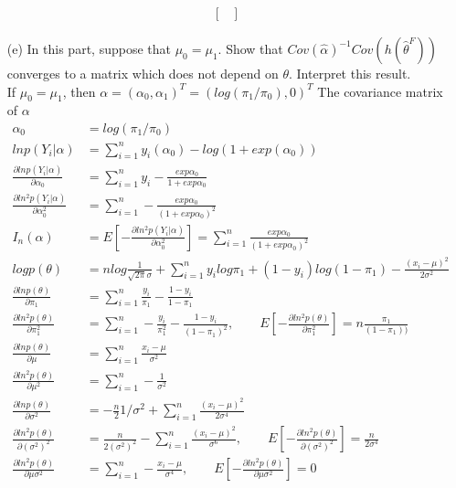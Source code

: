 \documentclass[11pt]{article} %
\begin{document}
\begin{itemize}
\begin{align*}
\begin{bmatrix}
		\end{bmatrix}
	\end{align*}   
	\item[(e)] In this part, suppose that $\mu_0= \mu_1$. Show that $Cov(\hat\alpha)^{-1} Cov(h(\hat\theta^F))$ converges to a matrix which does not depend on $\theta$. Interpret this result.\\
	If $\mu_0= \mu_1$, then $\alpha = (\alpha_0, \alpha_1)^T = \left(log(\pi_1/\pi_0) ,  0 \right)^T$
	The covariance matrix of $\alpha$
	\begin{align*}    
		\alpha_0 & = log(\pi_1/\pi_0)\\
		ln p(Y_i|\alpha) &= \sum_{i=1}^n y_i (\alpha_0) - log \left(1 + exp(\alpha_0) \right)\\
		\frac{\partial ln p(Y_i|\alpha)}{\partial \alpha_0}  &= \sum_{i=1}^n y_i -\frac{exp\alpha_0}{1+ exp\alpha_0}\\
		\frac{\partial ln^2 p(Y_i|\alpha)}{\partial \alpha_0^2}  &= \sum_{i=1}^n -\frac{exp\alpha_0}{(1+ exp\alpha_0)^2}\\
		I_n(\alpha) &= E[-\frac{\partial ln^2 p(Y_i|\alpha)}{\partial \alpha_0^2}] = \sum_{i=1}^n \frac{exp\alpha_0}{(1+ exp\alpha_0)^2}\\
		log p(\theta) &= nlog \frac{1}{\sqrt{2\pi}\sigma} + \sum_{i=1}^n y_i log\pi_1 + (1-y_i) log(1-\pi_1) - \frac{(x_i-\mu)^2}{2\sigma^2} \\
		\frac{\partial ln p(\theta)}{\partial \pi_1}  &= \sum_{i=1}^n \frac{y_i}{\pi_1} - \frac{1-y_i}{1-\pi_1} \\
		\frac{\partial ln^2 p(\theta)}{\partial \pi_1^2}  &= \sum_{i=1}^n -\frac{y_i}{\pi_1^2} - \frac{1-y_i}{(1-\pi_1)^2} , \qquad E[-\frac{\partial ln^2 p(\theta)}{\partial \pi_1^2}] = n\frac{\pi_1}{(1-\pi_1))}\\
		\frac{\partial ln p(\theta)}{\partial \mu}  &= \sum_{i=1}^n \frac{x_i-\mu}{\sigma^2}  \\
		\frac{\partial ln^2 p(\theta)}{\partial \mu^2}  &= \sum_{i=1}^n -\frac{1}{\sigma^2}  \\  
		\frac{\partial ln p(\theta)}{\partial \sigma^2}  &=-\frac{n}{2}{1/\sigma^2} + \sum_{i=1}^n \frac{(x_i-\mu)^2}{2\sigma^4} \\
		\frac{\partial ln^2 p(\theta)}{\partial (\sigma^2)^2}  &= \frac{n}{2(\sigma^2)^2} - \sum_{i=1}^n \frac{(x_i-\mu)^2}{\sigma^6}, \qquad E[-\frac{\partial ln^2 p(\theta)}{\partial (\sigma^2)^2}] = \frac{n}{2\sigma^4}  \\ 
		\frac{\partial ln^2 p(\theta)}{\partial \mu\sigma^2}  &= \sum_{i=1}^n- \frac{x_i-\mu}{\sigma^4} , \qquad E[-\frac{\partial ln^2 p(\theta)}{\partial \mu\sigma^2}] = 0

\end{align*}
\end{itemize}
\end{document}
